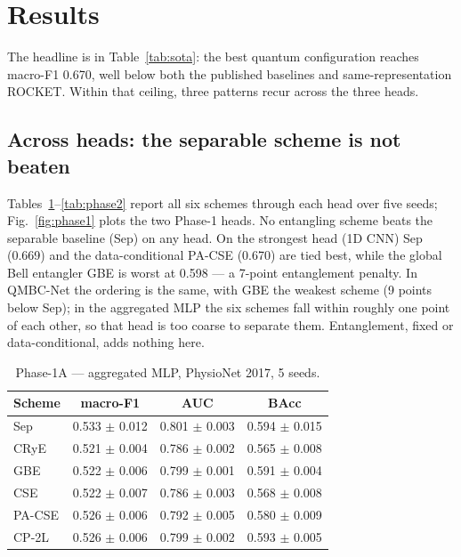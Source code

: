 \documentclass[conference,compsoc]{IEEEtran}
\begin{document}
\section{Results}
\label{sec:results}

The headline is in Table~\ref{tab:sota}: the best quantum configuration reaches macro-F1 0.670, well below both the published baselines and same-representation ROCKET. Within that ceiling, three patterns recur across the three heads.

\subsection{Across heads: the separable scheme is not beaten}

Tables~\ref{tab:phase1a}--\ref{tab:phase2} report all six schemes through each head over five seeds; Fig.~\ref{fig:phase1} plots the two Phase-1 heads. No entangling scheme beats the separable baseline (Sep) on any head. On the strongest head (1D CNN) Sep (0.669) and the data-conditional PA-CSE (0.670) are tied best, while the global Bell entangler GBE is worst at 0.598 --- a 7-point entanglement penalty. In QMBC-Net the ordering is the same, with GBE the weakest scheme (9 points below Sep); in the aggregated MLP the six schemes fall within roughly one point of each other, so that head is too coarse to separate them. Entanglement, fixed or data-conditional, adds nothing here.

\begin{table}[t]
\caption{Phase-1A --- aggregated MLP, PhysioNet 2017, 5 seeds.}
\label{tab:phase1a}
\centering
\begin{tabular}{lccc}
\toprule
Scheme & macro-F1 & AUC & BAcc \\
\midrule
Sep    & 0.533 $\pm$ 0.012 & 0.801 $\pm$ 0.003 & 0.594 $\pm$ 0.015 \\
CRyE   & 0.521 $\pm$ 0.004 & 0.786 $\pm$ 0.002 & 0.565 $\pm$ 0.008 \\
GBE    & 0.522 $\pm$ 0.006 & 0.799 $\pm$ 0.001 & 0.591 $\pm$ 0.004 \\
CSE    & 0.522 $\pm$ 0.007 & 0.786 $\pm$ 0.003 & 0.568 $\pm$ 0.008 \\
PA-CSE & 0.526 $\pm$ 0.006 & 0.792 $\pm$ 0.005 & 0.580 $\pm$ 0.009 \\
CP-2L  & 0.526 $\pm$ 0.006 & 0.799 $\pm$ 0.002 & 0.593 $\pm$ 0.005 \\
\bottomrule
\end{tabular}
\end{table}
\end{document}
